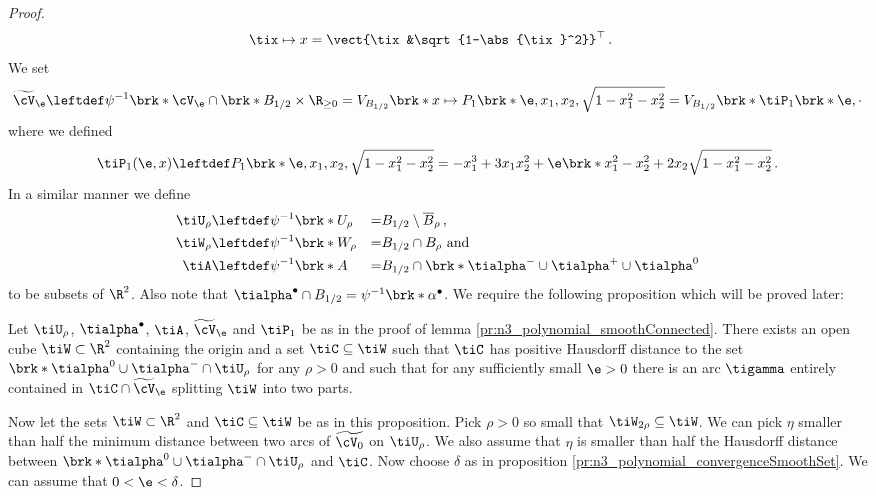 \begin{proof}
\begin{align*}
    \tix&\mapsto x=\vect{\tix&\sqrt{1-\abs{\tix}^2}}^\top\,.
  \end{align*}
  We set
  \begin{align*}
    \widetilde{\cV}_\e\leftdef\psi^{-1}\brk*{\cV_\e\cap \brk*{B_{1/2}\times\R_{\geq0}}}
    =V_{B_{1/2}}\brk*{x\mapsto P_1\brk*{\e,x_1,x_2,\sqrt{1-x_1^2-x_2^2}}}
    =V_{B_{1/2}}\brk*{\tiP_1\brk*{\e,\cdot}}
  \end{align*}
  where we defined
  \begin{align*}
    \tiP_1(\e,x)\leftdef P_1\brk*{\e,x_1,x_2,\sqrt{1-x_1^2-x_2^2}}
    =-x_1^3+3x_1x_2^2+\e\brk*{x_1^2-x_2^2+2x_2\sqrt{1-x_1^2-x_2^2}}\,.
  \end{align*}
  In a similar manner we define 
  \begin{alignat*}{3}
    \tiU_\rho&\leftdef\psi^{-1}\brk*{U_\rho}&=& B_{1/2}\setminus \overline{B}_\rho\,, \\
    \tiW_\rho&\leftdef\psi^{-1}\brk*{W_\rho}&=& B_{1/2}\cap B_{\rho}\text{ and} \\
    \tiA&\leftdef\psi^{-1}\brk*{A}&=&B_{1/2}\cap\brk*{\tialpha^-\cup\tialpha^+\cup\tialpha^0}
  \end{alignat*}
  to be subsets of $\R^2$. Also note that $\tialpha^\bullet\cap B_{1/2}=\psi^{-1}\brk*{\alpha^\bullet}$.
  We require the following proposition which will be proved later:
  \begin{proposition}\label{pr:n3_polynomial_regularH}
    Let $\tiU_\rho$, $\tialpha^\bullet$, $\tiA$, $\widetilde{\cV}_\e$ and $\tiP_1$ be as in the proof of lemma \ref{pr:n3_polynomial_smoothConnected}.
    There exists an open cube $\tiW\subset\R^2$ containing the origin and a set 
    $\tiC\subseteq \tiW$ such that $\tiC$ has positive Hausdorff distance to the set
    $\brk*{\tialpha^0\cup\tialpha^-}\cap \tiU_\rho$ for any $\rho>0$
    and such that for any sufficiently small $\e>0$ there is an arc $\tigamma$
    entirely contained in $\tiC\cap\widetilde{\cV}_\e$ splitting $\tiW$ into two parts.
  \end{proposition}
  Now let the sets $\tiW\subset\R^2$ and $\tiC\subseteq \tiW$ be as in this proposition.
  Pick $\rho>0$ so small that $\tiW_{2\rho}\subseteq \tiW$. 
  We can pick $\eta$ smaller than half the minimum distance between two arcs of $\widetilde{\cV_0}$ on $\tiU_{\rho}$.
  We also assume that $\eta$ is smaller than half the Hausdorff distance between $\brk*{\tialpha^0\cup\tialpha^-}\cap\tiU_\rho$
  and $\tiC$.
  Now choose $\delta$ as in proposition \ref{pr:n3_polynomial_convergenceSmoothSet}. We can assume that $0<\e<\delta$.

\end{proof}
